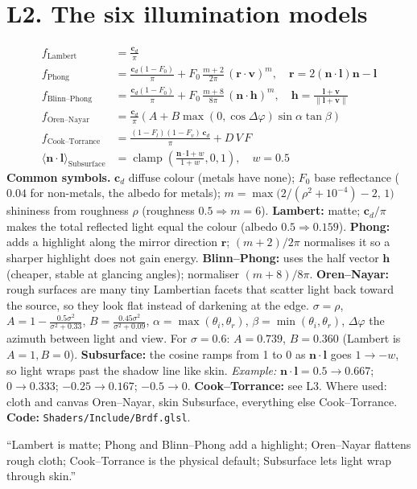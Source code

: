 \documentclass[11pt,a4paper]{article}
\newcommand{\code}[1]{{\small\texttt{#1}}}
\begin{document}
\section{L2. The six illumination models}
\begin{align*}
f_{\text{Lambert}}&=\frac{\mathbf c_d}{\pi}\\[3pt]
f_{\text{Phong}}&=\frac{\mathbf c_d(1-F_0)}{\pi}+F_0\,\frac{m+2}{2\pi}\,(\mathbf r\cdot\mathbf v)^{m},\quad \mathbf r=2(\mathbf n\cdot\mathbf l)\mathbf n-\mathbf l\\[3pt]
f_{\text{Blinn--Phong}}&=\frac{\mathbf c_d(1-F_0)}{\pi}+F_0\,\frac{m+8}{8\pi}\,(\mathbf n\cdot\mathbf h)^{m},\quad \mathbf h=\frac{\mathbf l+\mathbf v}{\lVert\mathbf l+\mathbf v\rVert}\\[3pt]
f_{\text{Oren--Nayar}}&=\frac{\mathbf c_d}{\pi}\left(A+B\max(0,\cos\Delta\varphi)\sin\alpha\tan\beta\right)\\[3pt]
f_{\text{Cook--Torrance}}&=\frac{(1-F_l)(1-F_v)\,\mathbf c_d}{\pi}+D\,V\,F\\[3pt]
\langle\mathbf n\cdot\mathbf l\rangle_{\text{Subsurface}}&=\operatorname{clamp}\!\left(\frac{\mathbf n\cdot\mathbf l+w}{1+w},0,1\right),\quad w=0.5
\end{align*}
\textbf{Common symbols.} $\mathbf c_d$ diffuse colour (metals have none); $F_0$ base reflectance ($0.04$ for non-metals, the albedo for metals); $m=\max\!\big(2/(\rho^2+10^{-4})-2,\,1\big)$ shininess from roughness $\rho$ (roughness $0.5\Rightarrow m=6$).
\textbf{Lambert:} matte; $\mathbf c_d/\pi$ makes the total reflected light equal the colour (albedo $0.5\Rightarrow0.159$).
\textbf{Phong:} adds a highlight along the mirror direction $\mathbf r$; $(m+2)/2\pi$ normalises it so a sharper highlight does not gain energy.
\textbf{Blinn--Phong:} uses the half vector $\mathbf h$ (cheaper, stable at glancing angles); normaliser $(m+8)/8\pi$.
\textbf{Oren--Nayar:} rough surfaces are many tiny Lambertian facets that scatter light back toward the source, so they look flat instead of darkening at the edge. $\sigma=\rho$, $A=1-\tfrac{0.5\sigma^2}{\sigma^2+0.33}$, $B=\tfrac{0.45\sigma^2}{\sigma^2+0.09}$, $\alpha=\max(\theta_i,\theta_r)$, $\beta=\min(\theta_i,\theta_r)$, $\Delta\varphi$ the azimuth between light and view. For $\sigma=0.6$: $A=0.739$, $B=0.360$ (Lambert is $A=1,B=0$).
\textbf{Subsurface:} the cosine ramps from 1 to 0 as $\mathbf n\cdot\mathbf l$ goes $1\to-w$, so light wraps past the shadow line like skin. \emph{Example:} $\mathbf n\cdot\mathbf l=0.5\to0.667$; $0\to0.333$; $-0.25\to0.167$; $-0.5\to0$.
\textbf{Cook--Torrance:} see L3. Where used: cloth and canvas Oren--Nayar, skin Subsurface, everything else Cook--Torrance. \textbf{Code:} \code{Shaders/Include/Brdf.glsl}.
\begin{say}``Lambert is matte; Phong and Blinn--Phong add a highlight; Oren--Nayar flattens rough cloth; Cook--Torrance is the physical default; Subsurface lets light wrap through skin.''\end{say}
\end{document}
